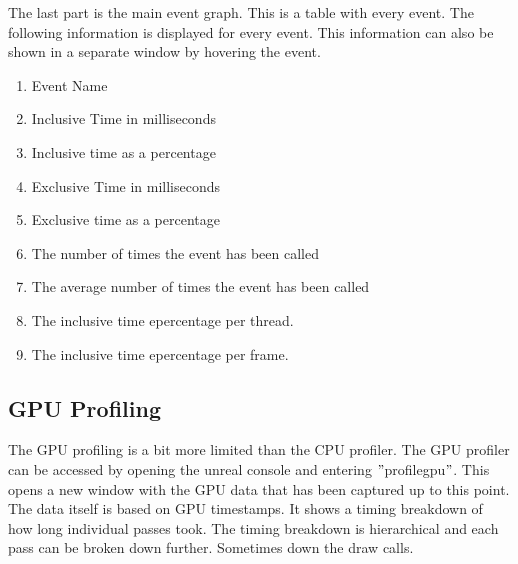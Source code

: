 The last part is the main event graph. This is a table with every event. The following information is displayed for every event. This information can also be shown in a separate window by hovering the event.

\begin{enumerate}
\item Event Name
\item Inclusive Time in milliseconds
\item Inclusive time as a percentage
\item Exclusive Time in milliseconds
\item Exclusive time as a percentage
\item The number of times the event has been called
\item The average number of times the event has been called
\item The inclusive time epercentage per thread.
\item The inclusive time epercentage per frame.
\end{enumerate}
\citep{unreal_profiler}

\subsection{GPU Profiling}

The GPU profiling is a bit more limited than the CPU profiler. The GPU profiler can be accessed by opening the unreal console and entering $"$profilegpu$"$. This opens a new window with the GPU data that has been captured up to this point. The data itself is based on GPU timestamps. It shows a timing breakdown of how long individual passes took. The timing breakdown is hierarchical and each pass can be broken down further. Sometimes down the draw calls.
\citep{unreal_gpu_profiling}

